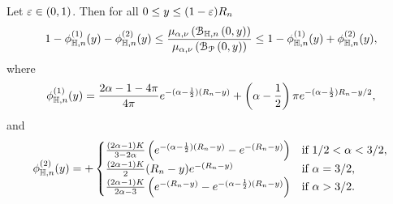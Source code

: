 \begin{lemma}\label{lem:average_degree_hyperbolic}
Let $\varepsilon \in (0, 1)$. Then for all $0 \le y \le (1 - \varepsilon)R_n$
\[
	 1 - \phi_{\mathbb{H},n}^{(1)}(y) - \phi_{\mathbb{H},n}^{(2)}(y) \le \frac{\mu_{\alpha,\nu}\left({\mathcal B}_{\mathbb{H},n}\left(0,y\right)\right)}{\mu_{\alpha,\nu}\left({\mathcal B}_{{\mathcal P}}\left(0,y\right)\right)} 
	 \le 1 - \phi_{\mathbb{H},n}^{(1)}(y) + \phi_{\mathbb{H},n}^{(2)}(y),
\]
where
\[
	\phi_{\mathbb{H},n}^{(1)}(y) = \frac{2\alpha - 1 - 4\pi}{4\pi} e^{-(\alpha - \frac{1}{2})(R_n - y)} 
		+ \left(\alpha - \frac{1}{2}\right)\pi e^{-(\alpha - \frac{1}{2})R_n - y/2},
\]
and
\[
	\phi_{\mathbb{H},n}^{(2)}(y) = 
	+ \begin{cases}
			\frac{(2\alpha - 1)K}{3 - 2\alpha}\left(e^{-(\alpha - \frac{1}{2})(R_n - y)} - e^{-(R_n - y)}\right)
			&\mbox{if } 1/2 < \alpha < 3/2,\\
			\frac{(2\alpha -1)K}{2} (R_n - y)e^{-(R_n - y)} &\mbox{if } \alpha = 3/2,\\
			\frac{(2\alpha - 1)K}{2\alpha - 3} \left(e^{-(R_n - y)} - e^{-(\alpha - \frac{1}{2})(R_n - y)}\right)
			&\mbox{if } \alpha > 3/2.
		\end{cases}
\]
\end{lemma}

